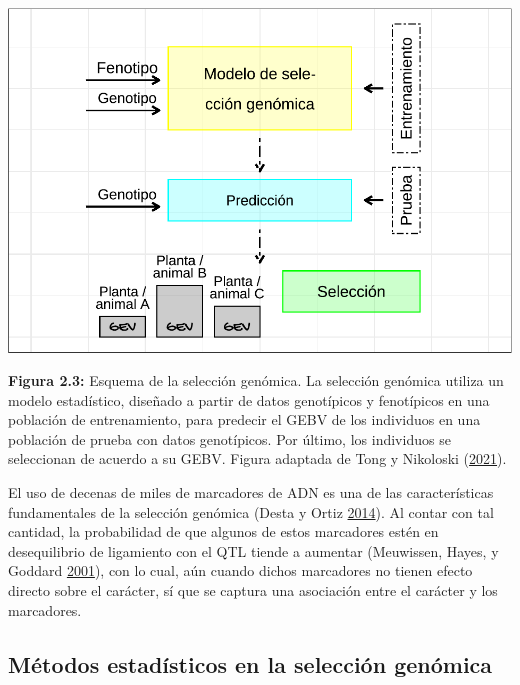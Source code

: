 \documentclass[11pt,spanish,a4paper,oneside,]{book} %
\begin{document}
\begin{center}\includegraphics[width=1\linewidth]{figures/GS} \end{center}

\noindent 
\textbf{Figura 2.3:} Esquema de la selección genómica. La selección genómica utiliza un modelo estadístico, diseñado a partir de datos genotípicos y fenotípicos en una población de entrenamiento, para predecir el GEBV de los individuos en una población de prueba con datos genotípicos. Por último, los individuos se seleccionan de acuerdo a su GEBV. Figura adaptada de Tong y Nikoloski (\protect\hyperlink{ref-cite:7}{2021}).

\hspace*{1em}

El uso de decenas de miles de marcadores de ADN es una de las características fundamentales de la selección genómica (Desta y Ortiz \protect\hyperlink{ref-cite:10}{2014}). Al contar con tal cantidad, la probabilidad de que algunos de estos marcadores estén en desequilibrio de ligamiento con el QTL tiende a aumentar (Meuwissen, Hayes, y Goddard \protect\hyperlink{ref-cite:8}{2001}), con lo cual, aún cuando dichos marcadores no tienen efecto directo sobre el carácter, sí que se captura una asociación entre el carácter y los marcadores.

\hypertarget{muxe9todos-estaduxedsticos-en-la-selecciuxf3n-genuxf3mica}{%
\subsection{Métodos estadísticos en la selección genómica}\label{muxe9todos-estaduxedsticos-en-la-selecciuxf3n-genuxf3mica}}
\end{document}
